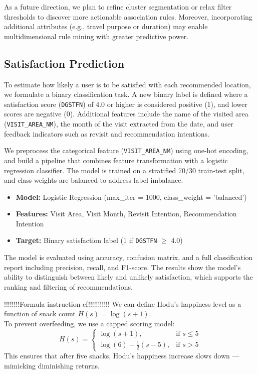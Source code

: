 \documentclass[sigconf]{acmart}
\begin{document}
As a future direction, we plan to refine cluster segmentation or relax filter thresholds to discover more actionable association rules. Moreover, incorporating additional attributes (e.g., travel purpose or duration) may enable multidimensional rule mining with greater predictive power.


\subsection{Satisfaction Prediction}

To estimate how likely a user is to be satisfied with each recommended location, we formulate a binary classification task. A new binary label is defined where a satisfaction score (\texttt{DGSTFN}) of 4.0 or higher is considered positive (1), and lower scores are negative (0). Additional features include the name of the visited area (\texttt{VISIT\_AREA\_NM}), the month of the visit extracted from the date, and user feedback indicators such as revisit and recommendation intentions.

We preprocess the categorical feature (\texttt{VISIT\_AREA\_NM}) using one-hot encoding, and build a pipeline that combines feature transformation with a logistic regression classifier. The model is trained on a stratified 70/30 train-test split, and class weights are balanced to address label imbalance.

\begin{itemize}
  \item \textbf{Model:} Logistic Regression (max\_iter = 1000, class\_weight = 'balanced')
  \item \textbf{Features:} Visit Area, Visit Month, Revisit Intention, Recommendation Intention
  \item \textbf{Target:} Binary satisfaction label (1 if \texttt{DGSTFN} $\geq$ 4.0)
\end{itemize}

The model is evaluated using accuracy, confusion matrix, and a full classification report including precision, recall, and F1-score. The results show the model’s ability to distinguish between likely and unlikely satisfaction, which supports the ranking and filtering of recommendations.


!!!!!!!!Formula instruction cf!!!!!!!!!!!
We can define Hodu’s happiness level as a function of 
snack count $H(s) = \log(s + 1)$. \\
To prevent overfeeding, we use a capped scoring model:
 \begin{equation}
  H(s) = 
  \begin{cases}
    \log(s + 1), & \text{if } s \leq 5 \\
    \log(6) - \frac{1}{2}(s - 5), & \text{if } s > 5
  \end{cases}
 \end{equation}
This ensures that after five snacks, Hodu’s happiness 
increase slows down — mimicking diminishing returns.
\end{document}
